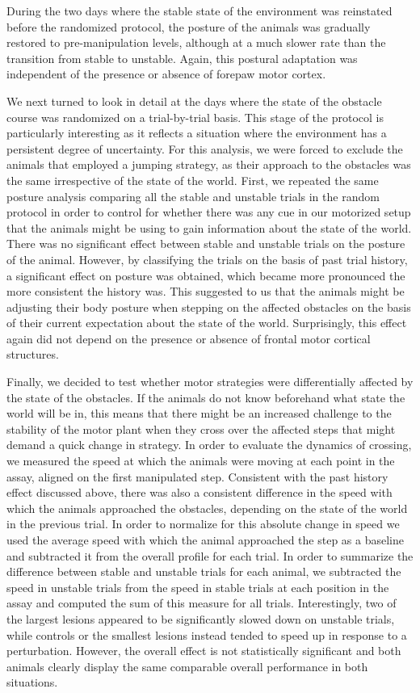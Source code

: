During the two days where the stable state of the environment was reinstated before the randomized protocol, the posture of the animals was gradually restored to pre-manipulation levels, although at a much slower rate than the transition from stable to unstable. Again, this postural adaptation was independent of the presence or absence of forepaw motor cortex.

We next turned to look in detail at the days where the state of the obstacle course was randomized on a trial-by-trial basis. This stage of the protocol is particularly interesting as it reflects a situation where the environment has a persistent degree of uncertainty. For this analysis, we were forced to exclude the animals that employed a jumping strategy, as their approach to the obstacles was the same irrespective of the state of the world. First, we repeated the same posture analysis comparing all the stable and unstable trials in the random protocol in order to control for whether there was any cue in our motorized setup that the animals might be using to gain information about the state of the world. There was no significant effect between stable and unstable trials on the posture of the animal. However, by classifying the trials on the basis of past trial history, a significant effect on posture was obtained, which became more pronounced the more consistent the history was. This suggested to us that the animals might be adjusting their body posture when stepping on the affected obstacles on the basis of their current expectation about the state of the world. Surprisingly, this effect again did not depend on the presence or absence of frontal motor cortical structures.

Finally, we decided to test whether motor strategies were differentially affected by the state of the obstacles. If the animals do not know beforehand what state the world will be in, this means that there might be an increased challenge to the stability of the motor plant when they cross over the affected steps that might demand a quick change in strategy. In order to evaluate the dynamics of crossing, we measured the speed at which the animals were moving at each point in the assay, aligned on the first manipulated step. Consistent with the past history effect discussed above, there was also a consistent difference in the speed with which the animals approached the obstacles, depending on the state of the world in the previous trial. In order to normalize for this absolute change in speed we used the average speed with which the animal approached the step as a baseline and subtracted it from the overall profile for each trial. In order to summarize the difference between stable and unstable trials for each animal, we subtracted the speed in unstable trials from the speed in stable trials at each position in the assay and computed the sum of this measure for all trials. Interestingly, two of the largest lesions appeared to be significantly slowed down on unstable trials, while controls or the smallest lesions instead tended to speed up in response to a perturbation. However, the overall effect is not statistically significant and both animals clearly display the same comparable overall performance in both situations.

